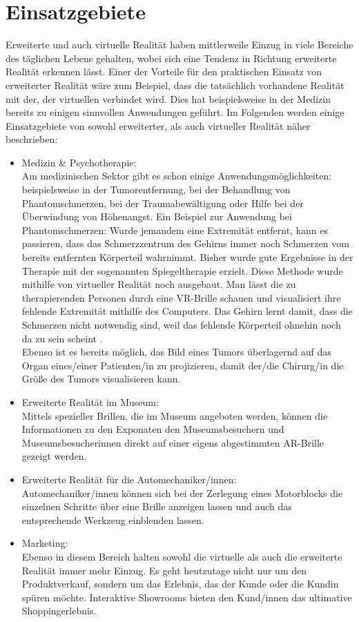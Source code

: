 \documentclass[deutsch]{llncs}
\begin{document}
\section{Einsatzgebiete}
Erweiterte und auch virtuelle Realität haben mittlerweile Einzug in viele Bereiche des täglichen Lebens gehalten, wobei sich eine Tendenz in Richtung erweiterte Realität erkennen lässt. Einer der Vorteile für den praktischen Einsatz von erweiterter Realität wäre zum Beispiel, dass die tatsächlich vorhandene Realität mit der, der virtuellen verbindet wird. Dies hat beispielsweise in der Medizin bereits zu einigen sinnvollen Anwendungen geführt. Im Folgenden werden einige Einsatzgebiete von sowohl erweiterter, als auch virtueller Realität näher beschrieben: 
\begin{itemize}
\item Medizin \& Psychotherapie:\\
Am medizinischen Sektor gibt es schon einige Anwendungsmöglichkeiten: beispielsweise in der Tumorentfernung, bei der Behandlung von Phantomschmerzen, bei der Traumabewältigung oder Hilfe bei der Überwindung von Höhenangst. 
Ein Beispiel zur Anwendung bei Phantomschmerzen: Wurde jemandem eine Extremität entfernt, kann es passieren, dass das Schmerzzentrum des Gehirns immer noch Schmerzen vom bereits entfernten Körperteil wahrnimmt. Bisher wurde gute Ergebnisse in der Therapie mit der sogenannten Spiegeltherapie erzielt. Diese Methode wurde mithilfe von virtueller Realität noch ausgebaut. Man lässt die zu therapierenden Personen durch eine VR-Brille schauen und visualisiert ihre fehlende Extremität mithilfe des Computers. Das Gehirn lernt damit, dass die Schmerzen nicht notwendig sind, weil das fehlende Körperteil ohnehin noch da zu sein scheint \cite{psycho}.  \\
Ebenso ist es bereits möglich, das Bild eines Tumors überlagernd auf das Organ eines/einer Patienten/in zu projizieren, damit der/die Chirurg/in die Größe des Tumors visualisieren kann.
\item Erweiterte Realität im Museum: \\
Mittels spezieller Brillen, die im Museum angeboten werden, können die Informationen zu den Exponaten den Museumsbesuchern und Museumsbesucherinnen direkt auf einer eigens abgestimmten AR-Brille gezeigt werden. 
\item Erweiterte Realität für die Automechaniker/innen:\\
Automechaniker/innen können sich bei der Zerlegung eines Motorblocks die einzelnen Schritte über eine Brille anzeigen lassen und auch das entsprechende Werkzeug einblenden lassen. 
\item Marketing: \\
Ebenso in diesem Bereich halten sowohl die virtuelle als auch die erweiterte Realität immer mehr Einzug. Es geht heutzutage nicht nur um den Produktverkauf, sondern um das Erlebnis, das der Kunde oder die Kundin spüren möchte. Interaktive Showrooms bieten den Kund/innen das ultimative Shoppingerlebnis.

\end{itemize}
\end{document}
